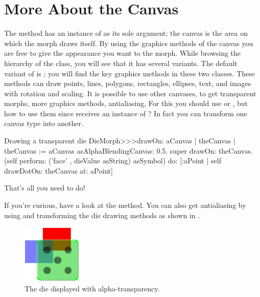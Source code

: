 \documentclass[a4paper,10pt,twoside]{book}
\begin{document}


\section{More About the Canvas}

The  method has an instance of  as its sole argument;
the canvas is the area on which the morph draws itself.
By using the graphics methods of the canvas you are free to give the appearance you want to the morph.
While browsing the hierarchy of the  class, you will see that it has several variants.
The default variant of  is ; you will find the key graphics methods in these two classes.
These methods can draw points, lines, polygons, rectangles, ellipses, text, and images with rotation and scaling.
It is possible to use other canvases, to get transparent morphs, more graphics methods, antialiasing, \etc
For this you should use  or , but how to use them since  receives an instance of ?
In fact you can transform one canvas type into another.

\begin{method}{Drawing a transparent die}
DieMorph>>>drawOn: aCanvas
   | theCanvas |
   theCanvas := aCanvas asAlphaBlendingCanvas: 0.5.
   super drawOn: theCanvas.
   (self perform: ('face' , dieValue asString) asSymbol)
      do: [:aPoint | self drawDotOn: theCanvas at: aPoint]
\end{method}
\noindent
That's all you need to do!

If you're curious, have a look at the  method.
You can also get antialiasing by using  and transforming the die drawing methods as shown in .

\begin{figure}[ht]
	\centerline{\includegraphics{multiMorphs}}
	\caption{The die displayed with alpha-transparency.
		\label{fig:multiMorphs}}
\end{figure}
\end{document}
